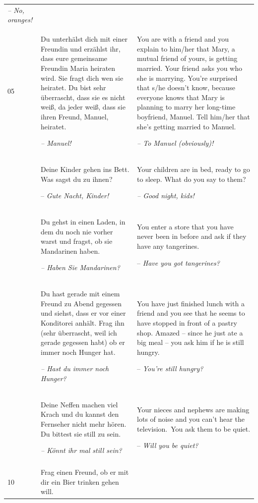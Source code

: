 \begin{xltabular}{\textwidth}{lQQ}
{\itshape -- No, oranges!}\\
05 & Du unterhälst dich mit einer Freundin und erzählst ihr, dass eure gemeinsame Freundin Maria heiraten wird. Sie fragt dich wen sie heiratet. Du bist sehr überrascht, dass sie es nicht weiß, da jeder weiß, dass sie ihren Freund, Manuel, heiratet.

\textit{-- Manuel!} & You are with a friend and you explain to him/her that Mary, a mutual friend of yours, is getting married. Your friend asks you who she is marrying. You're surprised that s/he doesn’t know, because everyone knows that Mary is planning to marry her long-time boyfriend, Manuel. Tell him/her that she’s getting married to Manuel.

{\itshape -- To Manuel (obviously)!}\\
 & Deine Kinder gehen ins Bett. Was sagst du zu ihnen?

-- \textit{Gute Nacht, Kinder!} & Your children are in bed, ready to go to sleep. What do you say to them?

{\itshape -- Good night, kids!}\\
 & Du gehst in einen Laden, in dem du noch nie vorher warst und fragst, ob sie Mandarinen haben.

\textit{-- Haben Sie Mandarinen?} & You enter a store that you have never been in before and ask if they have any tangerines.

-- \textit{Have you got tangerines?}\\
 & Du hast gerade mit einem Freund zu Abend gegessen und siehst, dass er vor einer Konditorei anhält. Frag ihn (sehr überrascht, weil ich gerade gegessen habt) ob er immer noch Hunger hat.

\textit{-- Hast du immer noch Hunger?} & You have just finished lunch with a friend and you see that he seems to have stopped in front of a pastry shop. Amazed -- since he just ate a big meal -- you ask him if he is still hungry.

-- \textit{You’re still hungry?}\\
 & Deine Neffen machen viel Krach und du kannst den Fernseher nicht mehr hören. Du bittest sie still zu sein.

\textit{-- Könnt ihr mal still sein?} & Your nieces and nephews are making lots of noise and you can’t hear the television.~You ask them to be quiet.

-- \textit{Will you be quiet?}\\
\\
10 & Frag einen Freund, ob er mit dir ein Bier trinken gehen will.


\end{xltabular}
